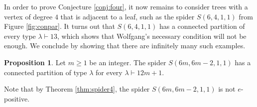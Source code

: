 \documentclass[12pt]{amsart}  %
\theoremstyle{definition}
\newtheorem{proposition}[theorem]{Proposition}
\theoremstyle{remark}
\numberwithin{equation}{section}
\begin{document}
In order to prove Conjecture \ref{conj:four}, it now remains to consider trees with a vertex of degree $4$ that is adjacent to a leaf, such as the spider $S(6,4,1,1)$ from Figure \ref{fig:conpar}. It turns out that $S(6,4,1,1)$ has a connected partition of every type $\lambda\vdash 13$, which shows that Wolfgang's necessary condition will not be enough. We conclude by showing that there are infinitely many such examples.

\begin{proposition}\label{prop:6mhas}
Let $m\geq 1$ be an integer. The spider $S(6m,6m-2,1,1)$ has a connected partition of type $\lambda$ for every $\lambda\vdash 12m+1$.
\end{proposition}

Note that by Theorem \ref{thm:spider4}, the spider $S(6m,6m-2,1,1)$ is not $e$-positive.
\end{document}
